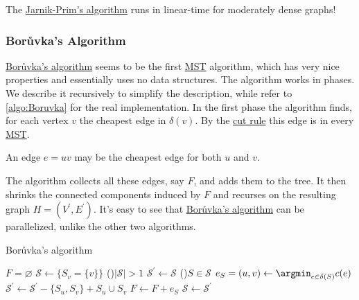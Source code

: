 \begin{remark}
	The \hyperref[algo:Jarnik-Prim]{Jarnik-Prim's algorithm} runs in linear-time for moderately dense graphs!
\end{remark}

\subsubsection{Borůvka's Algorithm}
\hyperref[algo:Boruvka]{Borůvka's algorithm} seems to be the first \hyperref[prb:MST]{MST} algorithm, which has very nice properties and essentially uses no data structures. The algorithm works in phases. We describe it recursively to simplify the description, while refer to \autoref{algo:Boruvka} for the real implementation. In the first phase the algorithm finds, for each vertex \(v\) the cheapest edge in \(\delta (v)\). By the \hyperref[lma:cut-rule]{cut rule} this edge is in every \hyperref[prb:MST]{MST}.

\begin{note}
	An edge \(e = uv\) may be the cheapest edge for both \(u\) and \(v\).
\end{note}

The algorithm collects all these edges, say \(F\), and adds them to the tree. It then shrinks the connected components induced by \(F\) and recurses on the resulting graph \(H = (V^{\prime}  , E^{\prime} )\). It's easy to see that \hyperref[algo:Boruvka]{Borůvka's algorithm} can be parallelized, unlike the other two algorithms.

\begin{algorithm}[H]\label{algo:Boruvka}
	\DontPrintSemicolon{}
	\caption{Borůvka's algorithm}
	\BlankLine

	\(F = \varnothing \)
	\(\mathcal{S} \gets \{ S_v = \{ v \} \} \)
	\While(){\(\lvert \mathcal{S} \rvert > 1\)}{
		\(\mathcal{S} ^{\prime} \gets \mathcal{S} \)
		\For(){\(S \in \mathcal{S} \)}{
			\(e_S = (u, v) \gets \argmin_{e \in \delta (S)} c(e)\)\;
			\(\mathcal{S}^{\prime} \gets \mathcal{S}^{\prime} - \{ S_u, S_v \} + S_u \cup S_v\)\label{algo:Boruvka-notation}
			\(F \gets F + e_S\)
		}
		\(\mathcal{S} \gets \mathcal{S} ^{\prime} \)
	}
	\;
\end{algorithm}

